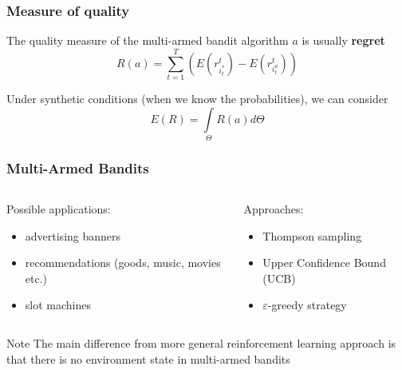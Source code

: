 \documentclass[fullscreen=true, bookmarks=true, hyperref={pdfencoding=unicode}]{beamer}
\begin{document}
\begin{frame}
  \frametitle{Measure of quality}


  \pause
  The quality measure of the multi-armed bandit algorithm $a$ is usually {\bf regret} $$ R(a) = \sum\limits_{t=1}^T \left(E(r_{i^*_t}^t) - E (r_{i^a_t}^t)\right)$$

  \vspace{1cm}
  Under synthetic conditions (when we know the probabilities), we can consider $$ E\left( R \right) = \int\limits_{\Theta} R(a)d\Theta$$
\end{frame}


\begin{frame}
   \frametitle{Multi-Armed Bandits}

   \begin{columns}
     \begin{column}{.4\paperwidth}
       Possible applications:
       \begin{itemize}
         \item advertising banners
         \item recommendations (goods, music, movies etc.)
         \item slot machines
       \end{itemize}
     \end{column}
     \begin{column}{.4\paperwidth}
       Approaches:
       \begin{itemize}
         \item Thompson sampling
         \item Upper Confidence Bound (UCB)
         \item $\varepsilon$-greedy strategy
       \end{itemize}
     \end{column}
   \end{columns}

   \vspace{1cm}
   \begin{block}{Note}
     The main difference from more general reinforcement learning approach is that there is no environment state in multi-armed bandits
   \end{block}
\end{frame}
\end{document}
